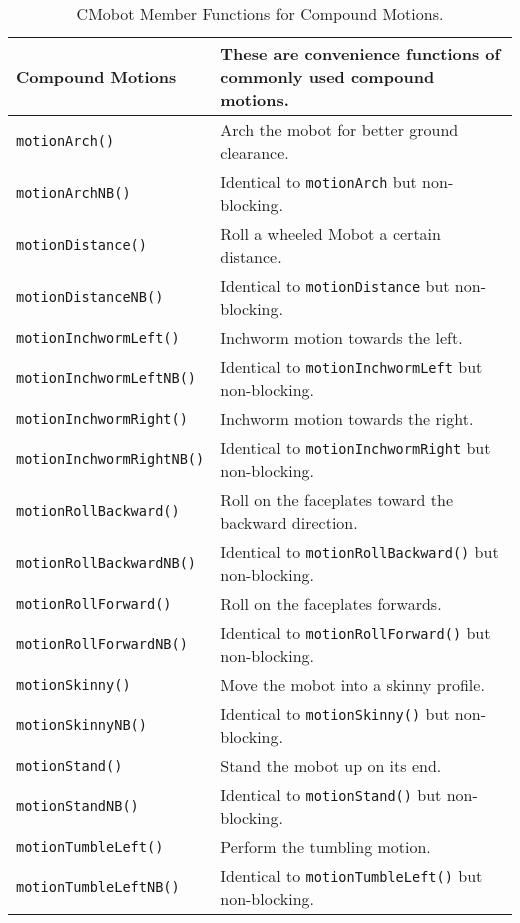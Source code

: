 \begin{table}[!h]
\begin{center}
\caption{CMobot Member Functions for Compound Motions.}
\begin{tabular}{p{38 mm}p{107 mm}}
Compound Motions & These are convenience functions of commonly used compound motions. \\
\hline
\texttt{motionArch()} \dotfill & Arch the mobot for better ground clearance. \\
\texttt{motionArchNB()} \dotfill & Identical to \texttt{motionArch} but non-blocking. \\
\texttt{motionDistance()} \dotfill & Roll a wheeled Mobot a certain distance. \\
\texttt{motionDistanceNB()} \dotfill & Identical to \texttt{motionDistance} but non-blocking. \\
\texttt{motionInchwormLeft()} \dotfill & Inchworm motion towards the left. \\
\texttt{motionInchwormLeftNB()} \dotfill & Identical to \texttt{motionInchwormLeft} but non-blocking. \\
\texttt{motionInchwormRight()} \dotfill & Inchworm motion towards the right. \\
\texttt{motionInchwormRightNB()} \dotfill & Identical to \texttt{motionInchwormRight} but non-blocking. \\
\texttt{motionRollBackward()} \dotfill & Roll on the faceplates toward the backward direction. \\
\texttt{motionRollBackwardNB()} \dotfill & Identical to \texttt{motionRollBackward()} but non-blocking. \\
\texttt{motionRollForward()} \dotfill & Roll on the faceplates forwards. \\
\texttt{motionRollForwardNB()} \dotfill & Identical to \texttt{motionRollForward()} but non-blocking. \\
\texttt{motionSkinny()} \dotfill & Move the mobot into a skinny profile. \\
\texttt{motionSkinnyNB()} \dotfill & Identical to \texttt{motionSkinny()} but non-blocking. \\
\texttt{motionStand()} \dotfill & Stand the mobot up on its end. \\
\texttt{motionStandNB()} \dotfill & Identical to \texttt{motionStand()} but non-blocking. \\
\texttt{motionTumbleLeft()} \dotfill & Perform the tumbling motion. \\
\texttt{motionTumbleLeftNB()} \dotfill & Identical to \texttt{motionTumbleLeft()} but non-blocking. \\

\end{tabular}
\end{center}
\end{table}
